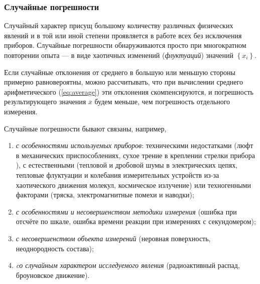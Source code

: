 \subsubsection{Случайные погрешности}

Случайный характер присущ большому количеству различных физических
явлений и в той или иной степени проявляется в работе всех без исключения
приборов. Случайные погрешности обнаруживаются просто при многократном
повторении опыта --- в виде хаотичных изменений (\emph{флуктуаций})
значений $\left\{ x_{i}\right\} $.

Если случайные отклонения от среднего в большую или меньшую стороны
примерно равновероятны, можно рассчитывать, что при вычислении среднего
арифметического (\ref{eq:average}) эти отклонения скомпенсируются,
и погрешность результирующего значения $\overline{x}$ будем меньше,
чем погрешность отдельного измерения.

Случайные погрешности бывают связаны, например,
\begin{enumerate}

    \item \emph{с особенностями используемых приборов}: техническими недостатками
(люфт в механических приспособлениях, сухое трение в креплении стрелки
прибора ), с естественными (тепловой и дробовой шумы в электрических
цепях, тепловые флуктуации и колебания измерительных устройств из-за
хаотического движения молекул, космическое излучение) или техногенными
факторами (тряска, электромагнитные помехи и наводки);

    \item \emph{с особенностями и несовершенством методики измерения} (ошибка
при отсчёте по шкале, ошибка времени реакции при измерениях с секундомером);

    \item \emph{с несовершенством объекта измерений} (неровная поверхность,
неоднородность состава);

    \item \emph{cо случайным характером исследуемого явления} (радиоактивный
распад, броуновское движение).

\end{enumerate}

